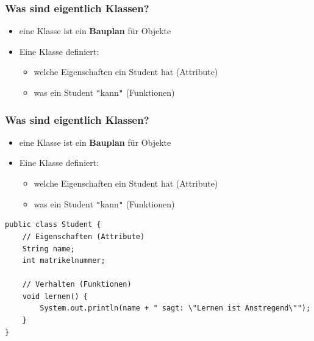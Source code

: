 \documentclass{../../presentation}
\begin{document}
\begin{frame}[fragile,t]
	\frametitle{Was sind eigentlich Klassen?}

	\begin{minipage}[t][0.9\textheight][t]{\textwidth}
		\begin{itemize}
			\item eine Klasse ist ein \textbf{Bauplan} für Objekte
			\item<2->Eine Klasse definiert:
			      \begin{itemize}
				      \item[\textbullet] welche Eigenschaften ein Student hat (Attribute)
				      \item[\textbullet] was ein Student \texttt{"}kann\texttt{"} (Funktionen)
			      \end{itemize}
		\end{itemize}

		\vspace{3.5cm}
	\end{minipage}

\end{frame}

\begin{frame}[fragile,t]
	\frametitle{Was sind eigentlich Klassen?}

	\begin{minipage}[t][0.9\textheight][t]{\textwidth}
		\begin{itemize}
			\item eine Klasse ist ein \textbf{Bauplan} für Objekte
			\item Eine Klasse definiert:
			      \begin{itemize}
				      \item[\textbullet] welche Eigenschaften ein Student hat (Attribute)
				      \item[\textbullet] was ein Student \texttt{"}kann\texttt{"} (Funktionen)
			      \end{itemize}
		\end{itemize}

		\begin{verbatim}
public class Student {
    // Eigenschaften (Attribute)
    String name;
    int matrikelnummer;

    // Verhalten (Funktionen)
    void lernen() {
        System.out.println(name + " sagt: \"Lernen ist Anstregend\"");
    }
}
\end{verbatim}
	\end{minipage}
\end{frame}
\end{document}
